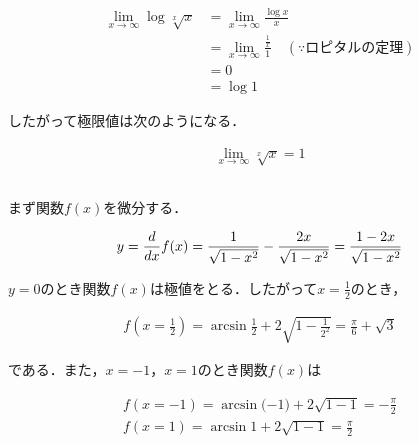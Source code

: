\begin{align*}
  \lim_{x \to \infty} \log \sqrt[x]{x} &= \lim_{x \to \infty} \frac{\log x}{x} \\
  &= \lim_{x \to \infty} \frac{\frac{1}{x}}{1} \quad \left( \because ロピタルの定理 \right) \\
  &= 0 \\
  &= \log 1
\end{align*}

したがって極限値は次のようになる．

\begin{gather*}
  \lim_{x \to \infty} \sqrt[x]{x} = 1
\end{gather*}


\subsection{}



\subsubsection{}

まず関数$f(x)$を微分する．

\begin{gather*}
  y = \dv{x} f(x) = \frac{1}{\sqrt{1-x^2}} - \frac{2x}{\sqrt{1-x^2}} = \frac{1-2x}{\sqrt{1-x^2}}
\end{gather*}

$y=0$のとき関数$f(x)$は極値をとる．したがって$x=\frac{1}{2}$のとき，

\begin{gather*}
  f(x=\frac{1}{2}) = \arcsin \frac{1}{2} + 2 \sqrt{1-\frac{1}{2^2}}
  = \frac{\pi}{6} + \sqrt{3}
\end{gather*}

である．また，$x=-1$，$x=1$のとき関数$f(x)$は

\begin{gather*}
  f(x=-1) = \arcsin \lparen -1 \rparen + 2 \sqrt{1-1} = - \frac{\pi}{2} \\
  f(x=1) = \arcsin 1 + 2 \sqrt{1-1} = \frac{\pi}{2}
\end{gather*}

